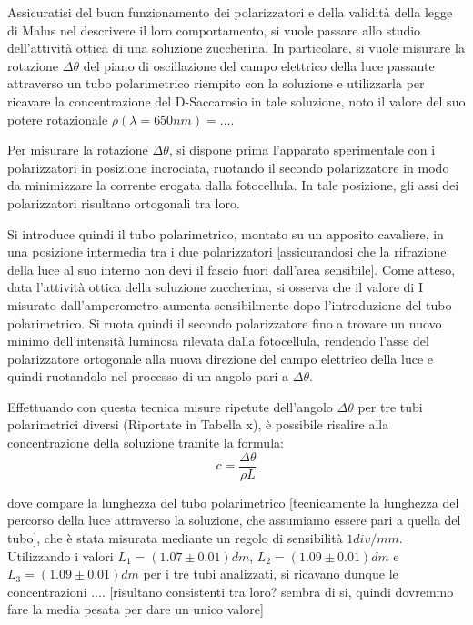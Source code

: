 \documentclass{article}
\begin{document}
	
	Assicuratisi del buon funzionamento dei polarizzatori e della validità della legge di Malus nel descrivere il loro comportamento, si vuole passare allo studio dell'attività ottica di una soluzione zuccherina.
	In particolare, si vuole misurare la rotazione $\Delta \theta$ del piano di oscillazione del campo elettrico della luce passante attraverso un tubo polarimetrico riempito con la soluzione e utilizzarla per ricavare la concentrazione del D-Saccarosio in tale soluzione, noto il valore del suo potere rotazionale $\rho(\lambda=650nm)=...$.
	
	Per misurare la rotazione $\Delta \theta$, si dispone prima l'apparato sperimentale con i polarizzatori in posizione incrociata, ruotando il secondo polarizzatore in modo da minimizzare la corrente erogata dalla fotocellula. In tale posizione, gli assi dei polarizzatori risultano ortogonali tra loro.
	
	Si introduce quindi il tubo polarimetrico, montato su un apposito cavaliere, in una posizione intermedia tra i due polarizzatori [assicurandosi che la rifrazione della luce al suo interno non devi il fascio fuori dall'area sensibile].
	Come atteso, data l'attività ottica della soluzione zuccherina, si osserva che il valore di I misurato dall'amperometro aumenta sensibilmente dopo l'introduzione del tubo polarimetrico.
	Si ruota quindi il secondo polarizzatore fino a trovare un nuovo minimo dell'intensità luminosa rilevata dalla fotocellula, rendendo l'asse del polarizzatore ortogonale alla nuova direzione del campo elettrico della luce e quindi ruotandolo nel processo di un angolo pari a $\Delta \theta$. 
	
	Effettuando con questa tecnica misure ripetute dell'angolo $\Delta \theta$ per tre tubi polarimetrici diversi (Riportate in Tabella x), è possibile risalire alla concentrazione della soluzione tramite la formula:
	$$c = \frac{\Delta \theta}{\rho L}$$
	
	dove compare la lunghezza del tubo polarimetrico [tecnicamente la lunghezza del percorso della luce attraverso la soluzione, che assumiamo essere pari a quella del tubo], che è stata misurata mediante un regolo di sensibilità $1 div/mm$.
	Utilizzando i valori $L_1 = (1.07 \pm 0.01) dm$, $L_2 = (1.09 \pm 0.01) dm$ e $L_3 = (1.09 \pm 0.01) dm$ per i tre tubi analizzati, si ricavano dunque le concentrazioni ....
	[risultano consistenti tra loro? sembra di si, quindi dovremmo fare la media pesata per dare un unico valore]
	

	
\end{document}
